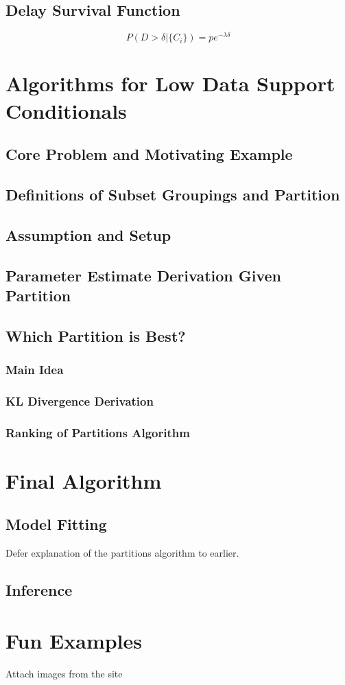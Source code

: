 \documentclass{article}
\begin{document}
\subsection{Delay Survival Function}
$$P(D>\delta | \{C_i\}) = p e^{-\lambda \delta}$$

\section{Algorithms for Low Data Support Conditionals}
\subsection{Core Problem and Motivating Example}
\subsection{Definitions of Subset Groupings and Partition}
\subsection{Assumption and Setup}
\subsection{Parameter Estimate Derivation Given Partition}
\subsection{Which Partition is Best?}
\subsubsection{Main Idea}
\subsubsection{KL Divergence Derivation}
\subsubsection{Ranking of Partitions Algorithm}

\section{Final Algorithm}
\subsection{Model Fitting}
Defer explanation of the partitions algorithm to earlier.
\subsection{Inference}

\section{Fun Examples}
Attach images from the site
\end{document}
